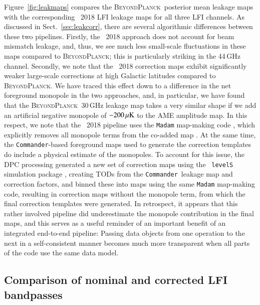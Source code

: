 \documentclass[twocolumn]{aa}
\def\commander{\texttt{Commander}}
\newcommand{\BP}{\textsc{BeyondPlanck}}
\newcommand{\?}[1]{\textcolor{red}{{\bf [#1]}}}
\begin{document}
Figure~\ref{fig:leakmaps} compares the \BP\ posterior mean leakage
maps with the corresponding \Planck\ 2018 LFI leakage maps for all
three LFI channels. As discussed in Sect.~\ref{sec:leakcorr}, there
are several algorithmic differences between these two
pipelines. Firstly, the \Planck\ 2018 approach does not account for beam
mismatch leakage, and, thus, we see much less small-scale fluctuations
in these maps compared to \BP; this is particularly striking in the
44\,GHz channel.
Secondly, we note that the \Planck\ 2018 correction maps exhibit
significantly weaker large-scale corrections at high Galactic
latitudes compared to \BP. We have traced this effect down to a
difference in the net foreground monopole in the two approaches, and,
in particular, we have found that the \BP\ 30\,GHz leakage map takes a
very similar shape if we add an artificial negative monopole of
$-200\muK$ to the AME amplitude map. In this respect, we note that the
\Planck\ 2018 pipeline uses the \texttt{Madam} map-making code
\citep{keihanen2005}, which explicitly removes all monopole terms from
the co-added map \citep{planck2016-l02}. At the same time, the
\commander-based foreground maps used to generate the correction
templates do include a physical estimate of the monopoles. To account
for this issue, the DPC processing generated a new set of correction
maps using the \Planck\ \texttt{levelS} simulation package
\citep{reinecke2006}, creating TODs from the \commander\ leakage map
and correction factors, and binned these into maps using the same
\texttt{Madam} map-making code, resulting in correction maps without
the monopole term, from which the final correction templates were
generated. In retrospect, it appears that this rather involved
pipeline did underestimate the monopole contribution in the final
maps, and this serves as a useful reminder of an important benefit of
an integrated end-to-end pipeline: Passing data objects from one
operation to the next in a self-consistent manner becomes much more
transparent when all parts of the code use the same data model. 

\subsection{Comparison of nominal and corrected LFI bandpasses}
\end{document}

